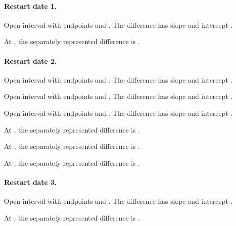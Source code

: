 \paragraph{Restart date 1.}
Open interval with endpoints  and . The difference has slope  and intercept .

At , the separately represented difference is .

\paragraph{Restart date 2.}
Open interval with endpoints  and . The difference has slope  and intercept .

Open interval with endpoints  and . The difference has slope  and intercept .

Open interval with endpoints  and . The difference has slope  and intercept .

At , the separately represented difference is .

At , the separately represented difference is .

At , the separately represented difference is .

\paragraph{Restart date 3.}
Open interval with endpoints  and . The difference has slope  and intercept .

At , the separately represented difference is .

